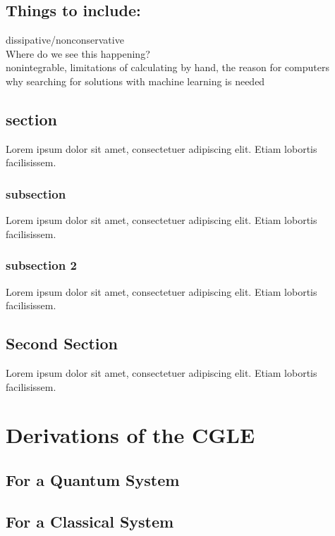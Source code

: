 \documentclass[a4paper,12pt]{report}
\begin{document}
\section{Things to include:}
dissipative/nonconservative\\
Where do we see this happening?\cite{Ref2}\\
nonintegrable, limitations of calculating by hand, the reason for computers\\
why searching for solutions with machine learning is needed\\
\cite[pp.~215]{RefExample} 

\section{section}
Lorem ipsum dolor sit amet, consectetuer adipiscing elit.  
Etiam lobortis facilisissem.  
\subsection{subsection}
Lorem ipsum dolor sit amet, consectetuer adipiscing elit.  
Etiam lobortis facilisissem.  
\subsection{subsection 2}
Lorem ipsum dolor sit amet, consectetuer adipiscing elit.  
Etiam lobortis facilisissem.  

\section{Second Section}
 
Lorem ipsum dolor sit amet, consectetuer adipiscing elit.  
Etiam lobortis facilisissem.  













\chapter{Derivations of the CGLE}
\section{For a Quantum System}
\section{For a Classical System}
\end{document}
